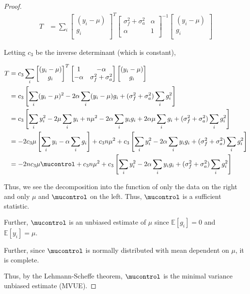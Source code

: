 \begin{proof}
\begin{align}
  T &=
\sum_i
\begin{bmatrix}
(y_i - \mu) \\
g_i \\
\end{bmatrix}^T
\begin{bmatrix}
\sigma^2_f + \sigma^2_a & \alpha \\
\alpha & 1 \\
\end{bmatrix}^{-1}
\begin{bmatrix}
(y_i - \mu) \\
g_i \\
\end{bmatrix}
\end{align}

Letting $c_3$ be the inverse determinant (which is constant),

\begin{align}
T &= c_3 \sum_i
\begin{bmatrix}
(y_i - \mu) \\
g_i \\
\end{bmatrix}^T
\begin{bmatrix}
1 & -\alpha \\
-\alpha & \sigma^2_f + \sigma^2_a \\
\end{bmatrix}
\begin{bmatrix}
(y_i - \mu) \\
g_i \\
\end{bmatrix} \\
&= c_3 \left[ \sum_i (y_i - \mu)^2 - 2 \alpha \sum_i (y_i - \mu) g_i + (\sigma^2_f + \sigma^2_a) \sum_i g_i^2 \right] \\
&= c_3 \left[ \sum_i y_i^2 - 2 \mu \sum_i y_i + n \mu^2 - 2 \alpha \sum_i y_i g_i + 2 \alpha \mu \sum_i g_i  + (\sigma^2_f + \sigma^2_a) \sum_i g_i^2 \right] \\
&=  -2c_3 \mu \left[\sum_i y_i -  \alpha \sum_i g_i \right]  + c_3n\mu^2 +  c_3 \left[ \sum_i y_i^2 - 2 \alpha \sum_i y_i g_i + (\sigma^2_f + \sigma^2_a) \sum_i g_i^2 \right] \\
&=  -2 n c_3 \mu \mucontrol  +  c_3n\mu^2 + c_3\left[ \sum_i y_i^2 - 2 \alpha \sum_i y_i g_i + (\sigma^2_f + \sigma^2_a) \sum_i g_i^2 \right]
\end{align}

Thus, we see the decomposition into the function of only the data on the right and only $\mu$ and $\mucontrol$ on the left. Thus, $\mucontrol$ is a sufficient statistic.

Further, $\mucontrol$ is an unbiased estimate of $\mu$ since $\mathbb{E}[g_i]=0$ and $\mathbb{E}[y_i] = \mu$. 

Further, since $\mucontrol$ is normally distributed with mean dependent on $\mu$, it is complete. 

Thus, by the Lehmann-Scheffe theorem, $\mucontrol$ is the minimal variance unbiased estimate (MVUE).

\end{proof}

